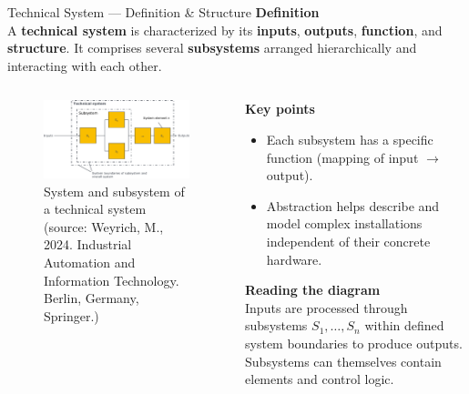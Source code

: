 \begin{frame}{Technical System — Definition \& Structure}
\textbf{Definition}\\
A \textbf{technical system} is characterized by its \textbf{inputs}, \textbf{outputs}, \textbf{function}, and \textbf{structure}. It comprises several \textbf{subsystems} arranged hierarchically and interacting with each other.

\vspace{-1.5mm}
\begin{columns}
	\begin{column}{0.55\textwidth}
		\begin{figure}
			\centering
			\includegraphics[width=\linewidth]{fig/lec01/tech_system.pdf}
			\caption*{System and subsystem of a technical system (source: Weyrich, M., 2024. Industrial Automation and Information Technology. Berlin, Germany, Springer.)}
		\end{figure}
	\end{column}
	\begin{column}{0.45\textwidth}
		\textbf{Key points}
		\begin{itemize}
		\item Each subsystem has a specific function (mapping of input $\rightarrow$ output).
		\item Abstraction helps describe and model complex installations independent of their concrete hardware.
		\end{itemize}
		\textbf{Reading the diagram}\\
		\footnotesize
		Inputs are processed through subsystems $S_1,\ldots,S_n$ within defined system boundaries to produce outputs. Subsystems can themselves contain elements and control logic.
	\end{column}
\end{columns}
\end{frame}


